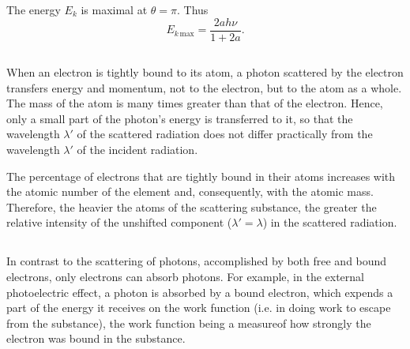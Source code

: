 The energy $E_{k}$ is maximal at $\theta = \pi$. Thus
\begin{equation*}%
E_{k \, \text{max}} = \frac{2a h \nu}{1 + 2a}.
\end{equation*}

\subsection{}\label{37.3.4} When an electron is tightly bound to its atom, a photon scattered by the electron transfers energy and momentum, not to the electron, but to the atom as a whole. The mass of the atom is many times greater than that of the electron. Hence, only a small part of the photon's energy is transferred to it, so that the wavelength $\lambda'$ of the scattered radiation does not differ practically from the wavelength $\lambda'$ of the incident radiation. 

The percentage of electrons that are tightly bound in their atoms increases with the atomic number of the element and, consequently, with the atomic mass. Therefore, the heavier the atoms of the scattering substance, the greater the relative intensity of the unshifted component ($\lambda' = \lambda$) in the scattered radiation.

\subsection{}\label{37.3.5} In contrast to the scattering of photons, accomplished by both free and bound electrons, only  electrons can absorb photons. For example, in the external photoelectric effect, a photon is absorbed by a bound electron, which expends a part of the energy it receives on the work function (i.e. in doing work to escape from the substance), the work function being a measureof how strongly the electron was bound in the substance.

